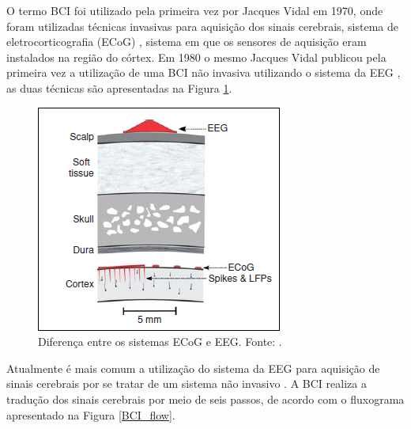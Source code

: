 O termo BCI foi utilizado pela primeira vez por Jacques Vidal em 1970, onde foram utilizadas técnicas invasivas para aquisição dos sinais cerebrais, sistema de eletrocorticografia (ECoG) \cite{BCIWolpaw}, sistema em que os sensores de aquisição eram instalados na região do córtex. Em 1980 o mesmo Jacques Vidal publicou pela primeira vez a utilização de uma BCI não invasiva utilizando o sistema da EEG \cite{CristophBCI}, as duas técnicas são apresentadas na Figura \ref{ECoGeEEG}.
\pagebreak


\begin{figure}[h]
	\centering
	\includegraphics[keepaspectratio=true,scale=1.0]{figuras/sistemas_de_aquisicao.PNG}
	\caption{Diferença entre os sistemas ECoG e EEG. Fonte: \cite{BCIWolpaw}.}
	\label{ECoGeEEG}
\end{figure}

Atualmente é mais comum a utilização do sistema da EEG para aquisição de sinais cerebrais por se tratar de um sistema não invasivo \cite{CristophBCI}. A BCI realiza a tradução dos sinais cerebrais por meio de seis passos, de acordo com o fluxograma apresentado na Figura \ref{BCI_flow}.

